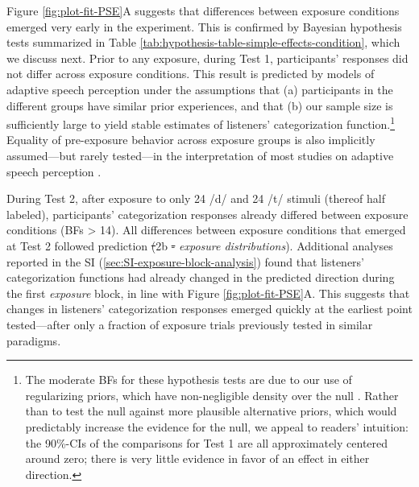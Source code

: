 \documentclass[
  11pt,
  man,mask,floatsintext]{apa6}
\makeatletter
\providecommand{\DIFadd}[1]{{\protect\color{blue}\uwave{#1}}} %
\providecommand{\DIFdel}[1]{{\protect\color{red}\sout{#1}}} %
\providecommand{\DIFaddbegin}{} %
\providecommand{\DIFaddend}{} %
\providecommand{\DIFdelbegin}{} %
\providecommand{\DIFdelend}{} %
\newcommand{\DIFscaledelfig}{0.5}
\newlength{\DIFdelgraphicswidth} %
\newlength{\DIFdelgraphicsheight} %
\newcommand{\DIFaddincludegraphics}[2][]{{\color{blue}\fbox{\DIFOincludegraphics[#1]{#2}}}} %
\newcommand{\DIFdelincludegraphics}[2][]{%
\sbox{\DIFdelgraphicsbox}{\DIFOincludegraphics[#1]{#2}}%
\settoboxwidth{\DIFdelgraphicswidth}{\DIFdelgraphicsbox} %
\settoboxtotalheight{\DIFdelgraphicsheight}{\DIFdelgraphicsbox} %
\scalebox{\DIFscaledelfig}{%
\parbox[b]{\DIFdelgraphicswidth}{\usebox{\DIFdelgraphicsbox}\\[-\baselineskip] \rule{\DIFdelgraphicswidth}{0em}}\llap{\resizebox{\DIFdelgraphicswidth}{\DIFdelgraphicsheight}{%
\setlength{\unitlength}{\DIFdelgraphicswidth}%
\begin{picture}(1,1)%
\thicklines\linethickness{2pt} %
{\color[rgb]{1,0,0}\put(0,0){\framebox(1,1){}}}%
{\color[rgb]{1,0,0}\put(0,0){\line( 1,1){1}}}%
{\color[rgb]{1,0,0}\put(0,1){\line(1,-1){1}}}%
\end{picture}%
}\hspace*{3pt}}} %
} %
\DeclareRobustCommand{\DIFaddbegin}{\DIFOaddbegin \let\includegraphics\DIFaddincludegraphics} %
\DeclareRobustCommand{\DIFaddend}{\DIFOaddend \let\includegraphics\DIFOincludegraphics} %
\DeclareRobustCommand{\DIFdelbegin}{\DIFOdelbegin \let\includegraphics\DIFdelincludegraphics} %
\DeclareRobustCommand{\DIFdelend}{\DIFOaddend \let\includegraphics\DIFOincludegraphics} %
\let\sout@orig\sout %
\renewcommand{\sout}[1]{\ifmmode\text{\sout@orig{\ensuremath{#1}}}\else\sout@orig{#1}\fi} %
\makeatother
\begin{document}
Figure \ref{fig:plot-fit-PSE}A suggests that differences between exposure conditions emerged very early in the experiment. This is confirmed by Bayesian hypothesis tests summarized in Table \ref{tab:hypothesis-table-simple-effects-condition}, which we discuss next. Prior to any exposure, during Test 1, participants' responses did not differ across exposure conditions. This result is predicted by models of adaptive speech perception under the assumptions that (a) participants in the different groups have similar prior experiences, and that (b) our sample size is sufficiently large to yield stable estimates of listeners' categorization function.\footnote{ The moderate BFs for these hypothesis tests are due to our use of regularizing priors, which have non-negligible density over the null \autocite[for an introduction to the Savage-Dickey method, see][]{wagenmakers2010}. Rather than to test the null against more plausible alternative priors, which would predictably increase the evidence for the null, we appeal to readers' intuition: the 90\%-CIs of the comparisons for Test 1 are all approximately centered around zero; there is very little evidence in favor of an effect in either direction.} Equality of pre-exposure behavior across exposure groups is also implicitly assumed---but rarely tested---in the interpretation of most studies on adaptive speech perception \autocite[when it is tested, it often turns out that this assumption is \emph{not} necessarily warranted, presumably due to insufficient sample sizes, cf.][]{kleinschmidt2020}.

During Test 2, after exposure to only 24 /d/ and 24 /t/ stimuli (thereof half labeled), participants' categorization responses already differed between exposure conditions (BFs \textgreater{} 14). All differences between exposure conditions that emerged at Test 2 followed prediction \DIFdelbegin \DIFdel{(}\DIFdelend 2b \DIFdelbegin \DIFdel{- }\DIFdelend \DIFaddbegin \DIFadd{(}\DIFaddend \emph{exposure distributions}). Additional analyses reported in the SI (\ref{sec:SI-exposure-block-analysis}) found that listeners' categorization functions had already changed in the predicted direction during the first \emph{exposure} block, in line with Figure \ref{fig:plot-fit-PSE}A. This suggests that changes in listeners' categorization responses emerged quickly at the earliest point tested---after only a fraction of exposure trials previously tested in similar paradigms.
\end{document}
